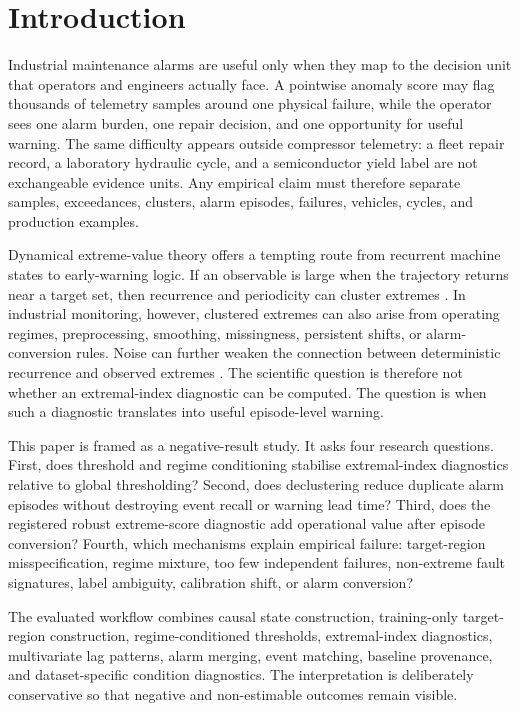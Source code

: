 \section{Introduction}
\label{sec:introduction}

Industrial maintenance alarms are useful only when they map to the decision unit that operators and engineers actually face. A pointwise anomaly score may flag thousands of telemetry samples around one physical failure, while the operator sees one alarm burden, one repair decision, and one opportunity for useful warning. The same difficulty appears outside compressor telemetry: a fleet repair record, a laboratory hydraulic cycle, and a semiconductor yield label are not exchangeable evidence units. Any empirical claim must therefore separate samples, exceedances, clusters, alarm episodes, failures, vehicles, cycles, and production examples.

Dynamical extreme-value theory offers a tempting route from recurrent machine states to early-warning logic. If an observable is large when the trajectory returns near a target set, then recurrence and periodicity can cluster extremes \citep{Freitas2008Hitting,Freitas2012Periodicity}. In industrial monitoring, however, clustered extremes can also arise from operating regimes, preprocessing, smoothing, missingness, persistent shifts, or alarm-conversion rules. Noise can further weaken the connection between deterministic recurrence and observed extremes \citep{Faranda2013Noise}. The scientific question is therefore not whether an extremal-index diagnostic can be computed. The question is when such a diagnostic translates into useful episode-level warning.

This paper is framed as a negative-result study. It asks four research questions. First, does threshold and regime conditioning stabilise extremal-index diagnostics relative to global thresholding? Second, does declustering reduce duplicate alarm episodes without destroying event recall or warning lead time? Third, does the registered robust extreme-score diagnostic add operational value after episode conversion? Fourth, which mechanisms explain empirical failure: target-region misspecification, regime mixture, too few independent failures, non-extreme fault signatures, label ambiguity, calibration shift, or alarm conversion?

The evaluated workflow combines causal state construction, training-only target-region construction, regime-conditioned thresholds, extremal-index diagnostics, multivariate lag patterns, alarm merging, event matching, baseline provenance, and dataset-specific condition diagnostics. The interpretation is deliberately conservative so that negative and non-estimable outcomes remain visible.

